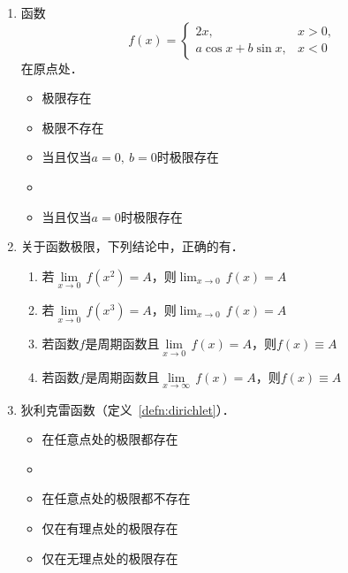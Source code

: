 \begin{enumerate}
\item 函数
  \begin{equation*}
    f(x) =
    \begin{cases}
      2x, & x > 0, \\
      a \cos x + b \sin x, & x < 0
    \end{cases}
  \end{equation*}
  在原点处\uline{\makebox[6em]{}}．
  \begin{itemize}
    \renewcommand{\labelitemi}{\faCircleThin}
  \item 极限存在
  \item 极限不存在
  \item 当且仅当\(a = 0,\ b = 0\)时极限存在
    \ifshowsol
    \item[\faCircle]
    \else
    \item
    \fi
    当且仅当\(a = 0\)时极限存在
  \end{itemize}

\item 关于函数极限，下列结论中，正确的有\uline{}．
  \begin{enumerate}
    \renewcommand{\labelenumii}{\enumparen{\arabic{enumii}}}
  \item 若\(\lim\limits_{x\to0} \,f(x^2) = A\)，则\(\lim_{x\to0} \,f(x) = A\)
  \item 若\(\lim\limits_{x\to0} \,f(x^3) = A\)，则\(\lim_{x\to0} \,f(x) = A\)
  \item 若函数\(f\)是周期函数且\(\lim\limits_{x\to0} \,f(x) = A\)，则\(f(x) \equiv A\)
  \item 若函数\(f\)是周期函数且\(\lim\limits_{x\to\infty} \,f(x) = A\)，则\(f(x) \equiv A\)
  \end{enumerate}

\item 狄利克雷函数（定义~\ref{defn:dirichlet}）\uline{\makebox[6em]{}}．
  \begin{itemize}
    \renewcommand{\labelitemi}{\faCircleThin}
  \item 在任意点处的极限都存在
    \ifshowsol
    \item[\faCircle]
    \else
    \item
    \fi
    在任意点处的极限都不存在
  \item 仅在有理点处的极限存在
  \item 仅在无理点处的极限存在
  \end{itemize}


\end{enumerate}
